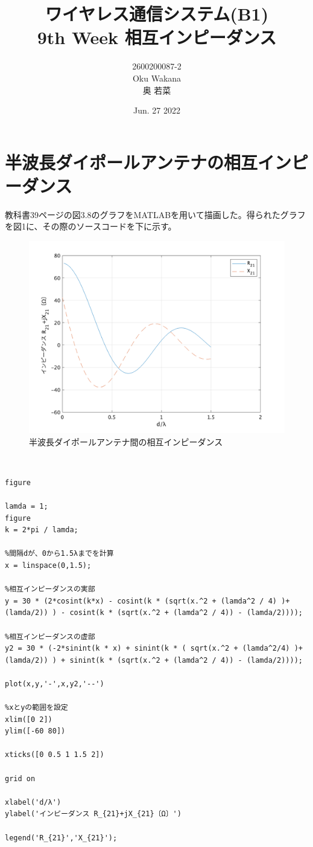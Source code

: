 \documentclass[dvipdfmx,autodetect-engine,titlepage]{jsarticle}
\title{ワイヤレス通信システム(B1)\\
9th Week 相互インピーダンス\\
}
\author{2600200087-2\\Oku Wakana\\奥 若菜}
\date{Jun. 27 2022}
\begin{document}
\maketitle

\section{半波長ダイポールアンテナの相互インピーダンス}
教科書39ページの図3.8のグラフをMATLABを用いて描画した。得られたグラフを図1に、その際のソースコードを下に示す。\\

\begin{figure}[H]
  \centering
  \includegraphics[scale=0.27]{week9_1.png}
  \caption{半波長ダイポールアンテナ間の相互インピーダンス}\label{fig:図1}
\end{figure}
　\\

\begin{lstlisting}[caption=ソースコード,label=1]
figure

lamda = 1;
figure
k = 2*pi / lamda;

%間隔dが、0から1.5λまでを計算
x = linspace(0,1.5);

%相互インピーダンスの実部
y = 30 * (2*cosint(k*x) - cosint(k * (sqrt(x.^2 + (lamda^2 / 4) )+ (lamda/2)) ) - cosint(k * (sqrt(x.^2 + (lamda^2 / 4)) - (lamda/2))));

%相互インピーダンスの虚部
y2 = 30 * (-2*sinint(k * x) + sinint(k * ( sqrt(x.^2 + (lamda^2/4) )+ (lamda/2)) ) + sinint(k * (sqrt(x.^2 + (lamda^2 / 4)) - (lamda/2))));

plot(x,y,'-',x,y2,'--')

%xとyの範囲を設定
xlim([0 2])
ylim([-60 80])

xticks([0 0.5 1 1.5 2])

grid on

xlabel('d/λ')
ylabel('インピーダンス R_{21}+jX_{21}〔Ω〕')

legend('R_{21}','X_{21}');
  
\end{lstlisting}
　\\
\end{document}
